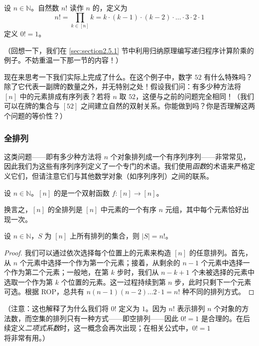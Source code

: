 \begin{definition}
    设 $n \in \mathbb{N}$。自然数 $n!$ 读作 $n$ 的，定义为
    \[n! = \prod_{k \in [n]} k = k \cdot (k - 1) \cdot (k - 2) \cdot \dots \cdot 3 \cdot 2 \cdot 1\]
    定义 $0!=1$。
\end{definition}
（回想一下，我们在 \ref{sec:section2.5.1} 节中利用归纳原理编写递归程序计算阶乘的例子。不妨重温一下那一节的内容！）

现在来思考一下我们实际上完成了什么。在这个例子中，数字 $52$ 有什么特殊吗？除了它代表一副牌的数量之外，并无特别之处！假设我们问：有多少种方法将 $[n]$ 中的元素排成有序列表？若将 $n$ 取 $52$，这便与之前的问题完全相同！（我们可以在牌的集合与 $[52]$ 之间建立自然的双射关系。你能做到吗？你是否理解这两个问题的等价性？）

\subsubsection*{全排列}

这类问题——即有多少种方法将 $n$ 个对象排列成一个有序列序列——非常常见，因此我们为这些有序列序列定义了一个专门的术语。我们使用\emph{函数}的术语来严格定义它们，但请注意它们与其他数学对象（如序列序列）之间的联系。

\begin{definition}
    设 $n \in \mathbb{N}$。$[n]$ 的是一个双射函数 $f : [n] \to [n]$。

    换言之，$[n]$ 的全排列是 $[n]$ 中元素的一个有序 $n$ 元组，其中每个元素恰好出现一次。
\end{definition}

\begin{proposition} \label{prop:proposition8.2.14}
    设 $n \in \mathbb{N}$，$S$ 为 $[n]$ 上所有排列的集合，则 $|S| = n!$。
\end{proposition}

\begin{proof}
    我们可以通过依次选择每个位置上的元素来构造 $[n]$ 的任意排列。首先，从 $n$ 个元素中选择一个作为第一个元素；接着，从剩余的 $n-1$ 个元素中选择一个作为第二个元素；一般地，在第 $k$ 步时，我们从 $n-k+1$ 个未被选择的元素中选取一个作为第 $k$ 个位置的元素。这一过程持续到第 $n$ 步，此时只剩下一个元素可选。根据 ROP，总共有 $n(n-1)(n-2) \dots 2 \cdot 1 = n!$ 种不同的排列方式。
\end{proof}
（注意：这也解释了为什么我们将 $0!$ 定义为 $1$。因为 $n!$ 表示排列 $n$ 个对象的方法数，而空集的排列只有一种方式——即空排列——因此 $0! = 1$ 是合理的。在后续定义\emph{二项式系数}时，这一概念会再次出现；在相关公式中，$0! = 1$ 将非常有用。）

